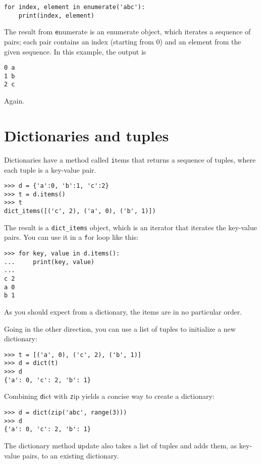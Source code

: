 \documentclass[
DIV=11,
fontsize=12,
twoside,
headinclude=false,
titlepage=firstiscover,
abstract=true,
headsepline=true,
footsepline=true,
chapterprefix=true, %
headings=big,
bibliography=totoc,%
captions=tableheading
]{scrbook}
\theoremstyle{definition}
\begin{document}
\begin{lstlisting}
for index, element in enumerate('abc'):
    print(index, element)
\end{lstlisting}
%
The result from {\texttt enumerate} is an enumerate object, which
iterates a sequence of pairs; each pair contains an index (starting
from 0) and an element from the given sequence.
In this example, the output is

\begin{lstlisting}
0 a
1 b
2 c
\end{lstlisting}
%
Again.


\section{Dictionaries and tuples}
\label{dictuple}

Dictionaries have a method called {\texttt items} that returns a sequence of
tuples, where each tuple is a key-value pair.

\begin{lstlisting}
>>> d = {'a':0, 'b':1, 'c':2}
>>> t = d.items()
>>> t
dict_items([('c', 2), ('a', 0), ('b', 1)])
\end{lstlisting}
%
The result is a \verb"dict_items" object, which is an iterator that
iterates the key-value pairs.  You can use it in a {\texttt for} loop
like this:

\begin{lstlisting}
>>> for key, value in d.items():
...     print(key, value)
...
c 2
a 0
b 1
\end{lstlisting}
%
As you should expect from a dictionary, the items are in no
particular order.

Going in the other direction, you can use a list of tuples to
initialize a new dictionary: 

\begin{lstlisting}
>>> t = [('a', 0), ('c', 2), ('b', 1)]
>>> d = dict(t)
>>> d
{'a': 0, 'c': 2, 'b': 1}
\end{lstlisting}

Combining {\texttt dict} with {\texttt zip} yields a concise way
to create a dictionary:

\begin{lstlisting}
>>> d = dict(zip('abc', range(3)))
>>> d
{'a': 0, 'c': 2, 'b': 1}
\end{lstlisting}
%
The dictionary method {\texttt update} also takes a list of tuples
and adds them, as key-value pairs, to an existing dictionary.
\end{document}
